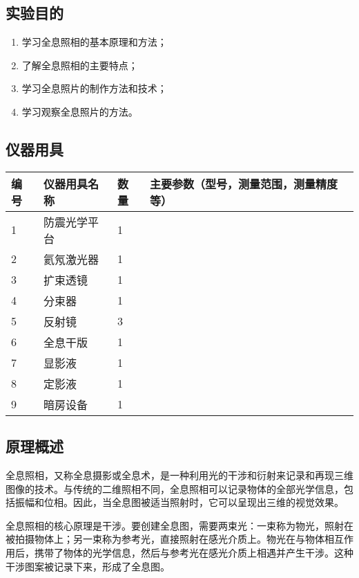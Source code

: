\documentclass[dvipsnames, svgnames,a4paper,11pt]{article}
\begin{document}
	\subsection{实验目的}
		\begin{enumerate}
			\item 学习全息照相的基本原理和方法；
			\item 了解全息照相的主要特点；
			\item 学习全息照片的制作方法和技术；
			\item 学习观察全息照片的方法。
			
			
		\end{enumerate}
	
	\subsection{仪器用具}
	\begin{table}[htbp]
		\centering
		\renewcommand\arraystretch{1.6}
		\begin{tabular}{p{}|p{}|p{}|p{}}
		\hline
		编号& 仪器用具名称 & 数量 &  主要参数（型号，测量范围，测量精度等） \\
		\hline
		1  & 防震光学平台 & 1  & ~  \\
		2  & 氦氖激光器  & 1  & ~  \\
		3  & 扩束透镜   & 1  & ~  \\
		4  & 分束器    & 1  & ~  \\
		5  & 反射镜    & 3  & ~  \\
		6  & 全息干版   & 1  & ~  \\
		7  & 显影液    & 1  & ~  \\
		8  & 定影液    & 1  & ~  \\
		9  & 暗房设备   & 1  & ~  \\
		\hline
	\end{tabular}
	\end{table}
	
	\subsection{原理概述}
		
	全息照相，又称全息摄影或全息术，是一种利用光的干涉和衍射来记录和再现三维图像的技术。与传统的二维照相不同，全息照相可以记录物体的全部光学信息，包括振幅和位相。因此，当全息图被适当照射时，它可以呈现出三维的视觉效果。

	全息照相的核心原理是干涉。要创建全息图，需要两束光：一束称为物光，照射在被拍摄物体上；另一束称为参考光，直接照射在感光介质上。物光在与物体相互作用后，携带了物体的光学信息，然后与参考光在感光介质上相遇并产生干涉。这种干涉图案被记录下来，形成了全息图。
	
\end{document}

